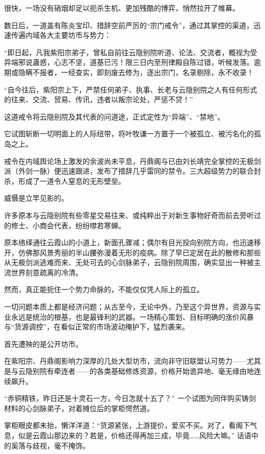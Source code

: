 很快，一场没有硝烟却足以扼杀生机、更加残酷的博弈，悄然拉开了帷幕。

数日后，一道盖有陈炎宝印、措辞空前严厉的“宗门戒令”，通过其掌控的渠道，迅速传遍内域各大主要坊市与势力：

“即日起，凡我紫阳宗弟子，曾私自前往云隐别院听道、论法、交流者，概视为受异端邪说蛊惑，心志不坚，道基已污！限三日内至刑律殿自陈过错，听候发落。逾期或隐瞒不报者，一经查实，即刻废去修为，逐出宗门，名录剔除，永不收录！

“自今往后，紫阳宗上下，严禁任何弟子、执事、长老与云隐别院之人有任何形式的往来、交流、贸易、传讯，违者以叛宗论处，严惩不贷！”

这道戒令将云隐别院及其代表的问道途，正式定性为“异端”、“禁地”。

它试图斩断一切明面上的人际纽带，将叶牧谦一方置于一个被孤立、被污名化的孤岛之上。

戒令在内域舆论场上激发的余波尚未平息，丹鼎阁与已由刘长靖完全掌控的无极剑派（外剑一脉）便迅速跟进，发布了措辞几乎雷同的禁令。三大超级势力的联合封杀，形成了一道令人窒息的无形壁垒。

威慑是立竿见影的。

许多原本与云隐别院有些零星交易往来、或纯粹出于对新生事物好奇而前去旁听过的修士、小商会代表，纷纷噤若寒蝉。

原本络绎通往云霞山的小道上，新面孔骤减；偶尔有目光投向别院方向，也迅速移开，仿佛那风景秀丽的半山腰弥漫着无形的疫病。除了早已定居在此的散修和那些从无极剑派逃难而来、无处可去的心剑脉弟子，云隐别院周围，确实显出一种被主流世界刻意疏离的冷清。

\vspace{2em}

然而，真正能扼住一个势力命脉的，不能仅仅凭人际上的孤立。

一切问题本质上都是经济问题；从古至今，无论中外，乃至这个异世界，资源与实业永远是统治的根基，也是最锋利的武器。一场精心策划、目标明确的涨价风暴与“货源调控”，在看似正常的市场波动掩护下，猛烈袭来。

首先遭殃的是公开坊市。

在紫阳宗、丹鼎阁影响力深厚的几处大型坊市，流向非守旧联盟认可势力——尤其是与云隐别院有牵连者——的各类基础修炼资源，价格开始诡异地、毫无缘由地连续飙升。

“赤铜精铁，昨日还是十灵石一方，今日怎就十五了？” 一个试图为同伴购买铸剑材料的心剑脉弟子，对着摊位后的掌柜愕然道。

掌柜眼皮都未抬，懒洋洋道：“货源紧张，上游提价，爱买不买。对了，看阁下气息，似是云霞山那边来的？若是，价格还得再加三成，毕竟……风险大嘛。” 话语中的奚落与歧视，毫不掩饰。

